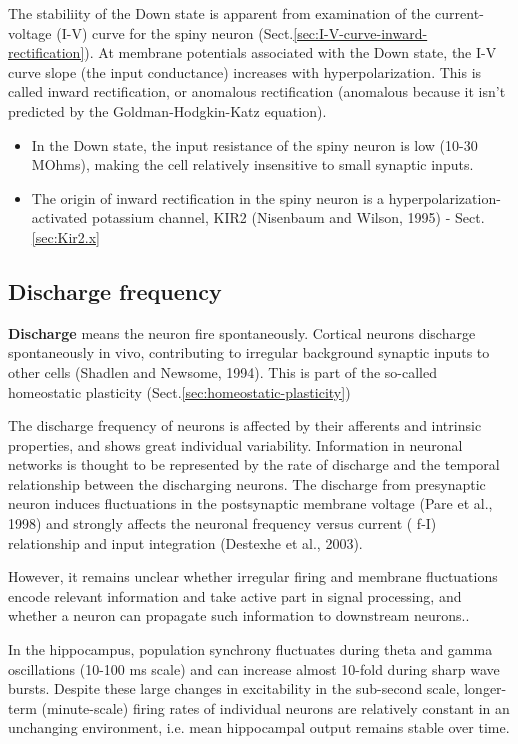 The stabiliity of the Down state is apparent from examination of the
current-voltage (I-V) curve for the spiny neuron
(Sect.\ref{sec:I-V-curve-inward-rectification}). At membrane potentials
associated with the Down state, the I-V curve slope (the input conductance)
increases with hyperpolarization. This is called inward rectification, or
anomalous rectification (anomalous because it isn't predicted by the
Goldman-Hodgkin-Katz equation).

\begin{itemize}
  \item   In the Down state, the input resistance of the spiny neuron is low
  (10-30 MOhms), making the cell relatively insensitive to small synaptic inputs.
  
  \item The origin of inward rectification in the spiny neuron is a
  hyperpolarization-activated potassium channel, KIR2 (Nisenbaum and Wilson,
  1995) - Sect.\ref{sec:Kir2.x}
\end{itemize}

\subsection{Discharge frequency}
\label{sec:discharge-frequency}

{\bf Discharge} means the neuron fire spontaneously.
Cortical neurons discharge spontaneously in vivo, contributing
to irregular background synaptic inputs to other cells (Shadlen
and Newsome, 1994). This is part of the so-called homeostatic plasticity
(Sect.\ref{sec:homeostatic-plasticity})

The discharge frequency of neurons is affected by their afferents and intrinsic
properties, and shows great individual variability.
Information in neuronal networks is thought to be represented by the rate of
discharge and the temporal relationship between the discharging neurons.
The discharge from presynaptic neuron induces fluctuations in the postsynaptic
membrane voltage (Pare et al., 1998) and strongly affects the neuronal frequency
versus current ( f-I) relationship and input integration (Destexhe et al.,
2003).

However, it remains unclear whether irregular firing and membrane fluctuations
encode relevant information and take active part in signal processing, and
whether a neuron can propagate such information to downstream
neurons.\citep{arsiero2007}.

In the hippocampus, population synchrony fluctuates during theta and gamma
oscillations (10-100 ms scale) and can increase almost 10-fold during sharp wave
bursts. Despite these large changes in excitability in the sub-second scale,
longer-term (minute-scale) firing rates of individual neurons are relatively
constant in an unchanging environment, i.e. mean hippocampal output remains
stable over time. 


